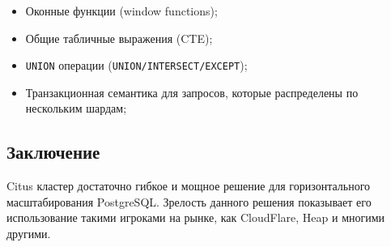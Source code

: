 \begin{itemize}
  \item Оконные функции (window functions);
  \item Общие табличные выражения (CTE);
  \item \lstinline!UNION! операции (\lstinline!UNION/INTERSECT/EXCEPT!);
  \item Транзакционная семантика для запросов, которые распределены по нескольким шардам;
\end{itemize}



\subsection{Заключение}

Citus кластер достаточно гибкое и мощное решение для горизонтального масштабирования PostgreSQL. Зрелость данного решения показывает его использование такими игроками на рынке, как CloudFlare, Heap и многими другими.
